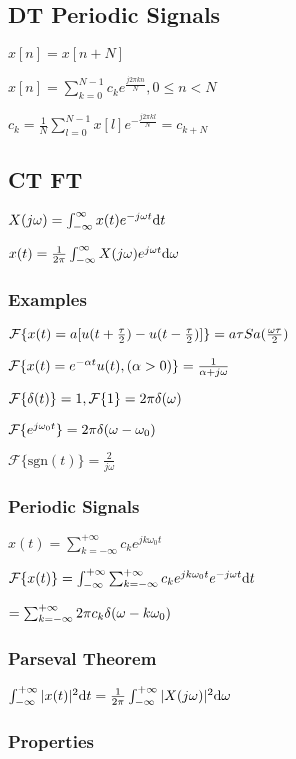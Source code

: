 \subsection{DT Periodic Signals}

$x[n] = x[n + N]$

$x[n]=\sum_{k=0}^{N-1} c_ke^{\frac{j2\pi k n}{N}}, 0\le n<N$

$c_k=\frac 1 N\sum_{l=0}^{N-1} x[l] e^{-\frac{j2\pi k l}{N}}=c_{k+N}$

\subsection{CT FT}

$X(j\omega) = \int_{-\infty}^{\infty} x(t) e^{-j\omega t} \mathrm{d} t$

$x(t)=\frac{1}{2\pi} \int_{-\infty}^{\infty} X(j\omega) e^{j\omega t}\mathrm{d} \omega$
\subsubsection*{Examples}

$\mathcal{F}\{x(t) = a[u(t+\frac\tau2)-u(t-\frac\tau2)]\} =  a\tau Sa(\frac{\omega\tau}{2})$

$\mathcal{F}\{x(t) = e^{-\alpha t} u(t), (\alpha>0)\}=\frac{1}{\alpha + j\omega}$

$\mathcal{F}\{\delta(t)\}=1, \mathcal{F}\{1\}=2\pi\delta(\omega)$

$\mathcal{F}\{e^{j\omega_0t}\} = 2\pi\delta(\omega-\omega_0)$

$\mathcal{F}\{\text{sgn}(t)\} = \frac{2}{j\omega}$
\subsubsection*{Periodic Signals}

$x(t)=\sum_{k=-\infty}^{+\infty} c_k e^{jk\omega_0 t}$

$\mathcal{F}\{x(t)\}=\int_{-\infty}^{+\infty} \sum_{k=-\infty}^{+\infty} c_ke^{jk\omega_0t} e^{-j\omega t}\mathrm{d} t$

$ = \sum_{k=-\infty}^{+\infty} 2\pi c_k \delta(\omega - k \omega_0)$

\subsubsection*{Parseval Theorem}

$\int_{-\infty}^{+\infty} |x(t)|^2\mathrm{d} t = \frac{1}{2\pi} \int_{-\infty}^{+\infty} |X(j\omega)|^2\mathrm{d} \omega$

\subsubsection*{Properties}

